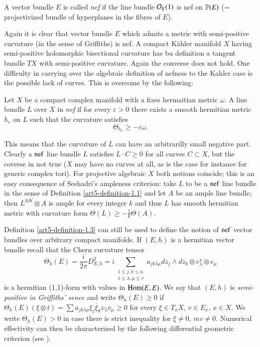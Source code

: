 \begin{definition}\label{art5-definition-1.3}
A vector bundle $E$ is called \textit{nef} if the line bundle $\mathcal{O}_{E}(1)$ is nef on $\mathbb{P}(E)$ (= projectivized bundle of hyperplanes in the fibres of $E$).

Again it is clear that vector bundle $E$ which admits a metric with semi-positive curvature (in the sense of Griffiths) is nef. A compact K\"ahler manifold $X$ having semi-positive holomorphic bisectional curvature has bu definition a tangent bundle $TX$ with semi-positive curvature. Again the converse does not hold. One difficulty in carrying over the algebraic definition of nefness to the Kahler case is the possible lack of curves. This is overcome by the following:
\end{definition}

\begin{definition}\label{art5-definition-1.4}
Let $X$ be a compact complex manifold with a fixes hermaitian metric $\omega$. A line bundle $L$ over $X$ in \textit{nef} if for every $\varepsilon > 0$ there exists a smooth hermitian metric $h_{\varepsilon}$ on $L$ such that the curvature satisfies
$$
\Theta_{h_{\varepsilon}} \geq -\varepsilon\omega.
$$

This means that the curvature of $L$ can have an arbitrarilly small negative part. Clearly a $\operatorname{nef}$ line bundle $L$ satisfies $L\cdot C \geq 0$ for all curves $C\subset X$, but the coverse in not true ($X$ may have no curves at all, as is the case for instance for generic complex tori). For projective algebraic $X$ both notions coincide; this is an easy consequence of Seshadri's ampleness criterion: take $L$ to be a $\operatorname{nef}$ line bundle in the sense of Definition
\ref{art5-definition-1.1} and let $A$ be an ample line bundle; then $L^{\otimes K}\otimes A$ is ample for every integer $k$ and thus $L$ has smooth hermitian metric with curvature form $\Theta(L) \geq -\frac{1}{k}\Theta(A)$.

Definition \ref{art5-definition-1.3} can still be used to define the notion of $\operatorname{nef}$ vector bundles over arbitrary compact manifolds. If $(E, h)$ is a hermitian vector bundle recall that the Chern curvature tensor
$$
\Theta_{h}(E) =\dfrac{i}{2\pi}D_{E, h}^{2} = i \sum\limits_{\substack{1 \leq j , k\leq n \\ 1 \leq \lambda, \mu \leq r}}
a_{jk\lambda\mu}dz_{j} \wedge d\overline{z}_{k}\otimes e_{\lambda}^{\star}\otimes e_{\mu}
$$
is a hermitian (1,1)-form with values in $\operatorname{Hom}(E, E)$. We say that $(E, h)$ is \textit{semi-positive in Griffiths' sence} \cite{art5-keyGr69} and write $\Theta_{h}(E) \geq 0$ if $\Theta_{h}(E)(\xi \otimes t) = \sum a_{jk\lambda \mu} \xi_{j}\overline{\xi}_{k}v_{\lambda}\overline{v}_{\mu}\geq 0$ for every $\xi \in T_{x}X$, $v\in E_{x}$, $x\in X$. We write $\Theta_{h}(E)> 0$ in case there is strict inequality for $\xi \neq 0$, $m v\neq 0$. Numerical effectivity can then be characterized by the following differential geometric criterion (see \cite{art5-keyDe91}).  
\end{definition}

